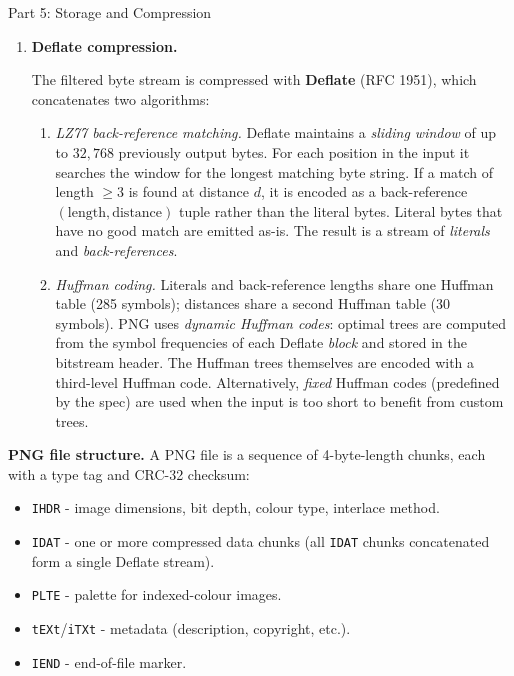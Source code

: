\documentclass[letterpaper]{article}
\begin{document}
\begin{notes}{Part 5: Storage and Compression}
\begin{enumerate}
\begin{enumerate}
        \item \textbf{Filter selection.} The PNG spec allows the encoder to choose the filter type per row freely. A common heuristic is to pick the filter that minimises the \emph{sum of absolute values} of the residuals for that row - a proxy for entropy. More sophisticated encoders evaluate all five options and use the one that produces the smallest compressed output (rate-optimal selection).
        
    \end{enumerate}
    
    \item \textbf{Deflate compression.}

    The filtered byte stream is compressed with \textbf{Deflate} (RFC 1951), which concatenates two algorithms:

    \begin{enumerate}
        \item \textit{LZ77 back-reference matching.} Deflate maintains a \emph{sliding window} of up to $32{,}768$ previously output bytes. For each position in the input it searches the window for the longest matching byte string. If a match of length $\ge 3$ is found at distance $d$, it is encoded as a back-reference $(\text{length}, \text{distance})$ tuple rather than the literal bytes. Literal bytes that have no good match are emitted as-is. The result is a stream of \emph{literals} and \emph{back-references}.

        \item \textit{Huffman coding.} Literals and back-reference lengths share one Huffman table (285 symbols); distances share a second Huffman table (30 symbols). PNG uses \emph{dynamic Huffman codes}: optimal trees are computed from the symbol frequencies of each Deflate \emph{block} and stored in the bitstream header. The Huffman trees themselves are encoded with a third-level Huffman code. Alternatively, \emph{fixed} Huffman codes (predefined by the spec) are used when the input is too short to benefit from custom trees.
    \end{enumerate}
\end{enumerate}





\textbf{PNG file structure.} A PNG file is a sequence of 4-byte-length chunks, each with a type tag and CRC-32 checksum:
\begin{itemize}
    \item \texttt{IHDR} - image dimensions, bit depth, colour type, interlace method.
    \item \texttt{IDAT} - one or more compressed data chunks (all \texttt{IDAT} chunks concatenated form a single Deflate stream).
    \item \texttt{PLTE} - palette for indexed-colour images.
    \item \texttt{tEXt}/\texttt{iTXt} - metadata (description, copyright, etc.).
    \item \texttt{IEND} - end-of-file marker.
\end{itemize}


\end{notes}
\end{document}
